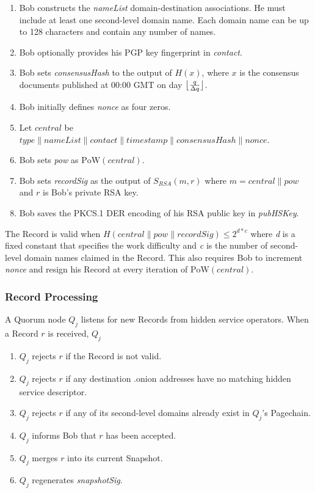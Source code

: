 \documentclass{sig-alternate}
\DeclarePairedDelimiter{\floor}{\lfloor}{\rfloor}
\newcommand*\concat{\mathbin{\|}}
\begin{document}
\begin{enumerate}
	\item Bob constructs the \emph{nameList} domain-destination associations. He must include at least one second-level domain name. Each domain name can be up to 128 characters and contain any number of names.
	\item Bob optionally provides his PGP key fingerprint in \emph{contact}.
	\item Bob sets \emph{consensusHash} to the output of $ H(x) $, where $ x $ is the consensus documents published at 00:00 GMT on day $ \floor[\big]{\frac{q}{\Delta q}} $.
	\item Bob initially defines \emph{nonce} as four zeros.
	\item Let $ \mathit{central} $ be $\mathit{type} \concat \mathit{nameList} \concat \mathit{contact} \concat \mathit{timestamp} \concat \mathit{consensusHash} \concat \mathit{nonce} $.
	\item Bob sets \emph{pow} as $ \mathrm{PoW}(\mathit{central}) $.
	\item Bob sets \emph{recordSig} as the output of $ S_{\mathit{RSA}}(m, r) $ where $ m = \mathit{central} \concat \mathit{pow} $ and $ r $ is Bob's private RSA key.
	\item Bob saves the PKCS.1 DER encoding of his RSA public key in \emph{pubHSKey}.
\end{enumerate}

The Record is valid when $ H(\mathit{central} \concat \mathit{pow} \concat \mathit{recordSig}) \leq 2^{\mathit{d} * \mathit{c}} $ where \emph{d} is a fixed constant that specifies the work difficulty and \emph{c} is the number of second-level domain names claimed in the Record. This also requires Bob to increment \emph{nonce} and resign his Record at every iteration of $ \mathrm{PoW}(\mathit{central}) $.

\subsubsection{Record Processing}

A Quorum node $ Q_{j} $ listens for new Records from hidden service operators. When a Record $ r $ is received, $ Q_{j} $

\begin{enumerate}
	\item $ Q_{j} $ rejects $ r $ if the Record is not valid.
	\item $ Q_{j} $ rejects $ r $ if any destination .onion addresses have no matching hidden service descriptor.
	\item $ Q_{j} $ rejects $ r $ if any of its second-level domains already exist in $ Q_{j} $'s Pagechain.
	\item $ Q_{j} $ informs Bob that $ r $ has been accepted.
	\item $ Q_{j} $ merges $ r $ into its current Snapshot.
	\item $ Q_{j} $ regenerates \emph{snapshotSig}.
\end{enumerate}
\end{document}
